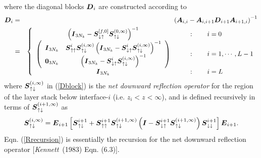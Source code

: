 where the diagonal blocks ${\bmi  D}_{i}$ are constructed according to
\begin{eqnarray} \label{Dblock}
{\bmi  D}_{i}&=&\left({\bmi  A}_{i,i}- {\bmi  A}_{i,i+1}{\bmi  D}_{i+1}{\bmi 
A}_{i+1,i}
\right)^{-1}\\
&=&\left\{{\begin{array}{cl}{\left({{\bmi  I}_{3 N_k}-{\bmi S}_{ \downarrow 
\uparrow 
}^{[f,0]}{\bmi S}_{ \uparrow \downarrow }^{(0,\infty)}}\right)}^{-1}& \qquad:\qquad
i=0\\ 
\left({\begin{array}{cc}{\bmi  I}_{3 N_k}&{{\bmi S}_{ \uparrow \uparrow 
}^{i}{\bmi S}_{ 
\uparrow \downarrow }^{(i,\infty)}\left({{\bmi  I}_{3 N_k}-{\bmi S}_{ 
\downarrow \uparrow }^{i}{\bmi S}_{ \uparrow \downarrow 
}^{(i,\infty)}}\right)}^{-1}\\ 
{\bf 0}_{3 N_k}&{\left({{\bmi  I}_{3 N_k}-{\bmi S}_{ \downarrow \uparrow 
}^{i}{\bmi S}_{ \uparrow \downarrow }^{(i,\infty)}}\right)}^{-1}\end{array}}\right)& \qquad:\qquad
i=1,\cdots ,L-1\\ {\bmi  I}_{3 N_k}&\qquad:\qquad i=L\end{array}}\right.\nonumber
\end{eqnarray}
where ${\bmi S}_{ \uparrow \downarrow}^{(i,\infty)}$ in (\ref{Dblock}) 
is the {\em net downward reflection operator\/} for the region of the layer 
stack below interface-$i$ (i.e. $z_{i} < z < \infty$), and is defined recursively in terms of 
${\bmi S}_{ \uparrow \downarrow}^{(i+1, \infty)}$ as 
\begin{equation} \label{Rrecursion}
{\bmi S}_{\uparrow \downarrow }^{(i,\infty)}={\bmi E}_{i+1}
\left[{{\bmi S}_{ \uparrow \downarrow }^{i+1}+{\bmi S}_{ \uparrow 
\uparrow }^{i+1}{\bmi S}_{ \uparrow \downarrow }^{(i+1, \infty   
)}\left({{\bmi I }-{\bmi S}_{ \downarrow \uparrow }^{i+1}{\bmi S}_{ \uparrow \downarrow 
}^{(i+1, \infty   )}}\right){\bmi S}_{\downarrow 
\downarrow}^{i+1}}\right]{\bmi E}_{i+1}.
\end{equation} 
Eqn. (\ref{Rrecursion}) is essentially the  recursion for the net downward 
reflection operator [{\em Kennett\/}~(1983) Eqn. (6.3)]. 

